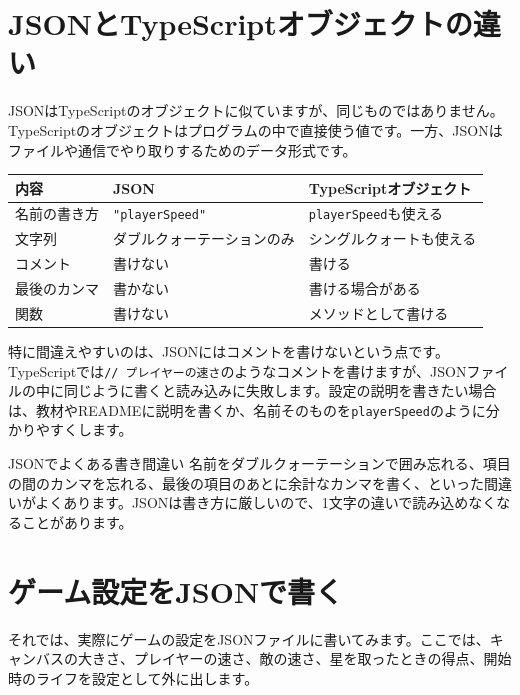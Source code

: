\section{JSONとTypeScriptオブジェクトの違い}

JSONはTypeScriptのオブジェクトに似ていますが、同じものではありません。TypeScriptのオブジェクトはプログラムの中で直接使う値です。一方、JSONはファイルや通信でやり取りするためのデータ形式です。

\begin{center}
\begin{tabular}{lll}
\toprule
内容 & JSON & TypeScriptオブジェクト \\
\midrule
名前の書き方 & \texttt{"playerSpeed"} & \texttt{playerSpeed}も使える \\
文字列 & ダブルクォーテーションのみ & シングルクォートも使える \\
コメント & 書けない & 書ける \\
最後のカンマ & 書かない & 書ける場合がある \\
関数 & 書けない & メソッドとして書ける \\
\bottomrule
\end{tabular}
\end{center}

特に間違えやすいのは、JSONにはコメントを書けないという点です。TypeScriptでは\texttt{// プレイヤーの速さ}のようなコメントを書けますが、JSONファイルの中に同じように書くと読み込みに失敗します。設定の説明を書きたい場合は、教材やREADMEに説明を書くか、名前そのものを\texttt{playerSpeed}のように分かりやすくします。

\begin{mistakebox}{JSONでよくある書き間違い}
名前をダブルクォーテーションで囲み忘れる、項目の間のカンマを忘れる、最後の項目のあとに余計なカンマを書く、といった間違いがよくあります。JSONは書き方に厳しいので、1文字の違いで読み込めなくなることがあります。
\end{mistakebox}

\section{ゲーム設定をJSONで書く}

それでは、実際にゲームの設定をJSONファイルに書いてみます。ここでは、キャンバスの大きさ、プレイヤーの速さ、敵の速さ、星を取ったときの得点、開始時のライフを設定として外に出します。

\begin{listing}[htbp]
\inputminted{json}{typescript-p5/listings/chapter16/game-settings.json}
\caption{ゲームの初期設定を書くJSONファイル}
\label{lst:chapter16-game-settings-json}
\end{listing}

